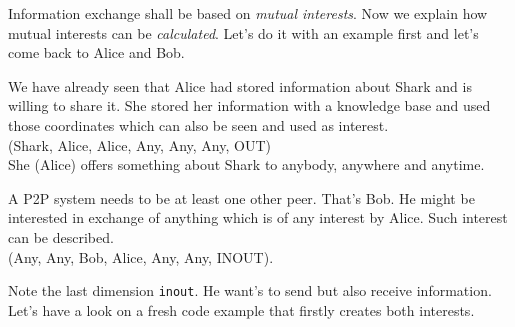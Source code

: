 Information exchange shall be based on {\it mutual interests}. Now we explain how mutual interests can be {\it calculated}. Let's do it with an example first and let's come back to Alice and Bob.

We have already seen that Alice had stored information about Shark and is willing to share it. She stored her information with a knowledge base and used those coordinates which can also be seen and used as interest.\\
(Shark, Alice, Alice, Any, Any, Any, OUT)\\
She (Alice) offers something about Shark to anybody, anywhere and anytime.

A P2P system needs to be at least one other peer. That's Bob. He might be interested in exchange of anything which is of any interest by Alice. Such interest can be described.\\
(Any, Any, Bob, Alice, Any, Any, INOUT).

Note the last dimension {\tt inout}. He want's to send but also receive  information. Let's have a look on a fresh code example that firstly creates both interests.

